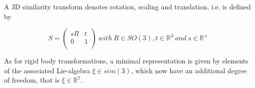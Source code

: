 A 3D similarity transform   denotes rotation, scaling and translation, i.e. is defined by

\begin{equation}
S=\left(
    \begin{array}{cc}
      sR & t \\
      0 & 1 \\
    \end{array}
  \right)
  \ with
  \ R\in SO(3),t\in {\mathbb{R}}^{3}
  \ and \ s\in {\mathbb{R}}^{+}
\end{equation}

As for rigid body transformations, a minimal representation is given by elements of the associated Lie-algebra $\xi  \in sim(3)$, which now have an additional degree of freedom, that is $\xi\in {\mathbb{R}}^{7}$.

\fi



